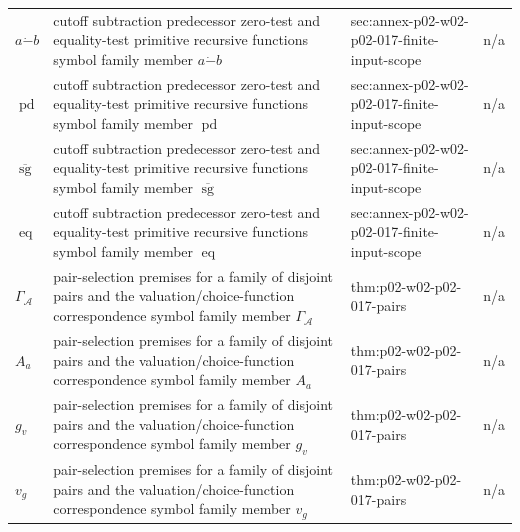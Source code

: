\begin{longtable}{@{}p{}p{}p{}p{}@{}}
\(a\mathbin{\dot{-}}b\) & cutoff subtraction predecessor zero-test and equality-test primitive recursive functions symbol family member \(a\mathbin{\dot{-}}b\) & sec:\allowbreak{}annex-\allowbreak{}p02-\allowbreak{}w02-\allowbreak{}p02-\allowbreak{}017-\allowbreak{}finite-\allowbreak{}input-\allowbreak{}scope & n/a \\
\(\operatorname{pd}\) & cutoff subtraction predecessor zero-test and equality-test primitive recursive functions symbol family member \(\operatorname{pd}\) & sec:\allowbreak{}annex-\allowbreak{}p02-\allowbreak{}w02-\allowbreak{}p02-\allowbreak{}017-\allowbreak{}finite-\allowbreak{}input-\allowbreak{}scope & n/a \\
\(\overline{\operatorname{sg}}\) & cutoff subtraction predecessor zero-test and equality-test primitive recursive functions symbol family member \(\overline{\operatorname{sg}}\) & sec:\allowbreak{}annex-\allowbreak{}p02-\allowbreak{}w02-\allowbreak{}p02-\allowbreak{}017-\allowbreak{}finite-\allowbreak{}input-\allowbreak{}scope & n/a \\
\(\operatorname{eq}\) & cutoff subtraction predecessor zero-test and equality-test primitive recursive functions symbol family member \(\operatorname{eq}\) & sec:\allowbreak{}annex-\allowbreak{}p02-\allowbreak{}w02-\allowbreak{}p02-\allowbreak{}017-\allowbreak{}finite-\allowbreak{}input-\allowbreak{}scope & n/a \\
\(\Gamma_{\mathcal A}\) & pair-selection premises for a family of disjoint pairs and the valuation/choice-function correspondence symbol family member \(\Gamma_{\mathcal A}\) & thm:\allowbreak{}p02-\allowbreak{}w02-\allowbreak{}p02-\allowbreak{}017-\allowbreak{}pairs & n/a \\
\(A_a\) & pair-selection premises for a family of disjoint pairs and the valuation/choice-function correspondence symbol family member \(A_a\) & thm:\allowbreak{}p02-\allowbreak{}w02-\allowbreak{}p02-\allowbreak{}017-\allowbreak{}pairs & n/a \\
\(g_v\) & pair-selection premises for a family of disjoint pairs and the valuation/choice-function correspondence symbol family member \(g_v\) & thm:\allowbreak{}p02-\allowbreak{}w02-\allowbreak{}p02-\allowbreak{}017-\allowbreak{}pairs & n/a \\
\(v_g\) & pair-selection premises for a family of disjoint pairs and the valuation/choice-function correspondence symbol family member \(v_g\) & thm:\allowbreak{}p02-\allowbreak{}w02-\allowbreak{}p02-\allowbreak{}017-\allowbreak{}pairs & n/a \\

\end{longtable}
